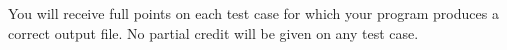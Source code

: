 You will receive full points on each test case for which your program produces a correct output file. No partial credit will be given on any test case.